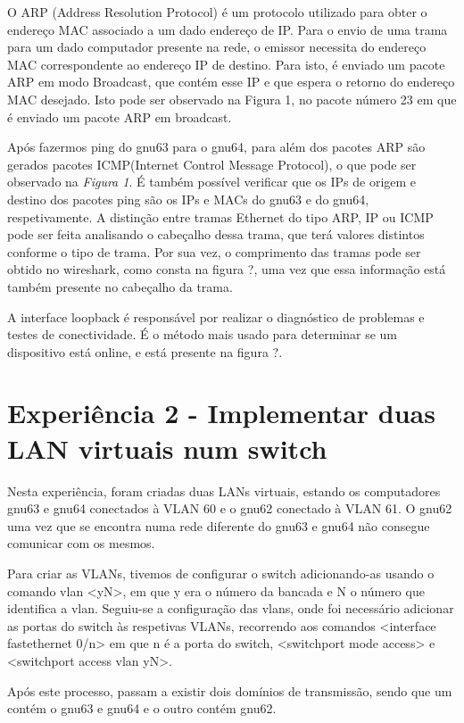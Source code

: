 \documentclass[article, a4paper, 11pt, oneside]{memoir}
\begin{document}
O ARP (Address Resolution Protocol) é um protocolo utilizado para obter o endereço MAC associado
a um dado endereço de IP. Para o envio de uma trama para um dado computador presente na rede, o emissor
necessita do endereço MAC correspondente ao endereço IP de destino. Para isto, é enviado um pacote ARP
em modo Broadcast, que contém esse IP e que espera o retorno do endereço MAC desejado.
Isto pode ser observado na Figura 1, no pacote número 23 em que é enviado um pacote ARP em broadcast.

Após fazermos ping do gnu63 para o gnu64, para além dos pacotes ARP são gerados pacotes ICMP(Internet Control Message Protocol), 
o que pode ser observado na \emph{Figura 1}.
É também possível verificar que os IPs de origem e destino dos pacotes ping são os IPs e MACs do gnu63 e do gnu64, respetivamente.
A distinção entre tramas Ethernet do tipo ARP, IP ou ICMP pode ser feita analisando o cabeçalho dessa trama, que terá valores distintos conforme o tipo de trama.
Por sua vez, o comprimento das tramas pode ser obtido no wireshark, como consta na figura ?, uma vez que essa informação está também presente no cabeçalho da trama.

A interface loopback é responsável por realizar o diagnóstico de problemas e testes de conectividade.
É o método mais usado para determinar se um dispositivo está online, e está presente na figura ?.


\section{Experiência 2 - Implementar duas LAN virtuais num switch}

Nesta experiência, foram criadas duas LANs virtuais, estando os computadores gnu63 e gnu64 conectados à VLAN 60 e o gnu62 conectado à VLAN 61.
O gnu62 uma vez que se encontra numa rede diferente do gnu63 e gnu64 não consegue comunicar com os mesmos.

Para criar as VLANs, tivemos de configurar o switch adicionando-as usando o comando vlan <yN>, 
em que y era o número da bancada e N o número que identifica a vlan. Seguiu-se a configuração das vlans,
onde foi necessário adicionar as portas do switch às respetivas VLANs, recorrendo aos comandos 
<interface fastethernet 0/n> em que n é a porta do switch, <switchport mode access> e <switchport access vlan yN>.

Após este processo, passam a existir dois domínios de transmissão, sendo que um contém o gnu63 e gnu64 e o outro contém gnu62.
\end{document}
